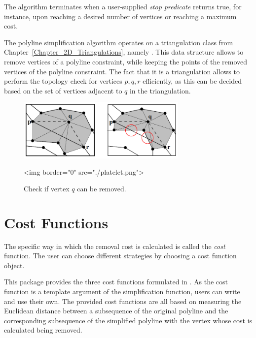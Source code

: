 The algorithm terminates when a user-supplied {\em stop predicate} returns true, for instance,
upon reaching a desired number of vertices or reaching a maximum cost.

The polyline simplification algorithm operates on a triangulation class from 
Chapter~\ref{Chapter_2D_Triangulations}, namely .
This data structure allows to remove vertices of a polyline constraint, while keeping the
points of the removed vertices of the polyline constraint. The fact that it is a triangulation 
allows to perform the topology check  for vertices $p,q,r$ efficiently, as this can be decided 
based on the set of vertices adjacent to $q$ in the triangulation.


\begin{figure}[ht]
\begin{center}
 \begin{ccTexOnly}
   \includegraphics[height=3cm]{Polyline_simplification_2/platelet.png}
 \end{ccTexOnly}
 \begin{ccHtmlOnly}
   <img border="0" src="./platelet.png">
 \end{ccHtmlOnly}
   \label{figure:platelet}
\end{center}
\caption{Check if vertex $q$ can be removed.}
\end{figure}


\section{Cost Functions}

The specific way in which the removal cost is
calculated is called the {\em cost} function. The user can choose
different strategies by choosing a cost function object.

This package provides the three cost functions formulated in \cite{cgal:dds-scs-09}.
As the cost function is a template argument of the simplification function,
users can write and use their own.
The provided cost functions  are all based on measuring the Euclidean distance
between a subsequence of the original polyline and the corresponding subsequence of the simplified polyline
with the vertex whose cost is calculated being removed.


